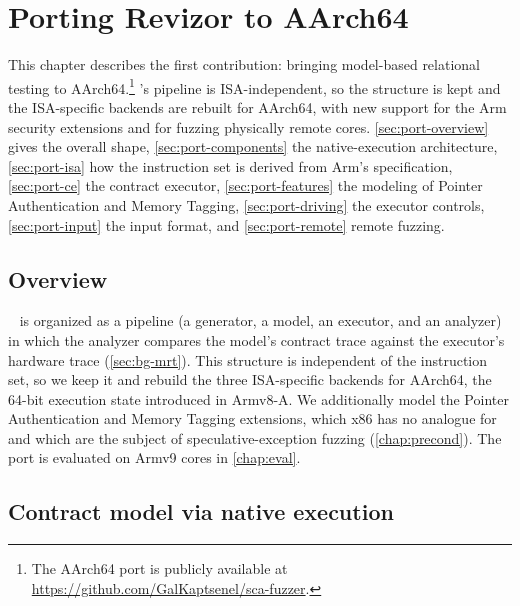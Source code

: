 \chapter{Porting Revizor to AArch64}
\label{chap:port}

This chapter describes the first contribution: bringing model-based relational testing to
AArch64.\footnote{The AArch64 port is publicly available at \url{https://github.com/GalKaptsenel/sca-fuzzer}.} \revizor{}'s pipeline is ISA-independent, so the structure is kept and the
ISA-specific backends are rebuilt for AArch64, with new support for the Arm security
extensions and for fuzzing physically remote cores. \autoref{sec:port-overview} gives the
overall shape, \autoref{sec:port-components} the native-execution architecture,
\autoref{sec:port-isa} how the instruction set is derived from Arm's specification,
\autoref{sec:port-ce} the contract executor, \autoref{sec:port-features} the modeling of
Pointer Authentication and Memory Tagging, \autoref{sec:port-driving} the executor controls,
\autoref{sec:port-input} the input format, and \autoref{sec:port-remote} remote fuzzing.

\section{Overview}
\label{sec:port-overview}

\revizor{}~\cite{revizor} is organized as a pipeline (a generator, a model, an executor,
and an analyzer) in which the analyzer compares the model's contract trace against the
executor's hardware trace (\autoref{sec:bg-mrt}). This structure is independent of the
instruction set, so we keep it and rebuild the three ISA-specific backends for AArch64, the
64-bit execution state introduced in Armv8-A. We additionally model the Pointer
Authentication and Memory Tagging extensions, which x86 \revizor{} has no analogue for and
which are the subject of speculative-exception fuzzing (\autoref{chap:precond}). The port is
evaluated on Armv9 cores in \autoref{chap:eval}.

\section{Contract model via native execution}
\label{sec:port-components}

